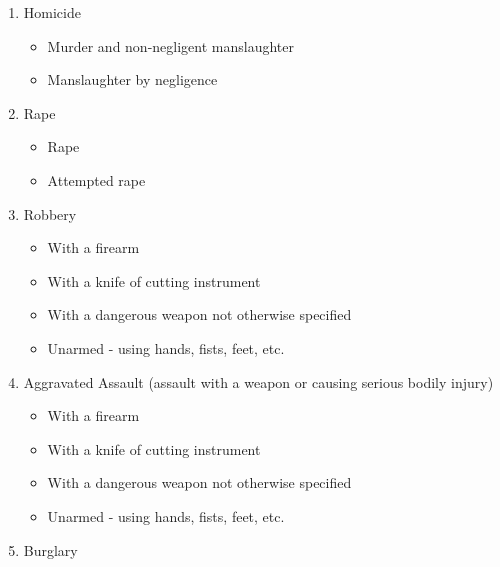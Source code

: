 \documentclass[
  12pt,
]{book}
\providecommand{\tightlist}{%
  \setlength{\itemsep}{0pt}\setlength{\parskip}{0pt}}
\begin{document}
\begin{enumerate}
\def\labelenumi{\arabic{enumi}.}
\tightlist
\item
  Homicide

  \begin{itemize}
  \tightlist
  \item
    Murder and non-negligent manslaughter\\
  \item
    Manslaughter by negligence\\
  \end{itemize}
\item
  Rape

  \begin{itemize}
  \tightlist
  \item
    Rape\\
  \item
    Attempted rape\\
  \end{itemize}
\item
  Robbery

  \begin{itemize}
  \tightlist
  \item
    With a firearm\\
  \item
    With a knife of cutting instrument\\
  \item
    With a dangerous weapon not otherwise specified\\
  \item
    Unarmed - using hands, fists, feet, etc.\\
  \end{itemize}
\item
  Aggravated Assault (assault with a weapon or causing serious bodily injury)

  \begin{itemize}
  \tightlist
  \item
    With a firearm\\
  \item
    With a knife of cutting instrument\\
  \item
    With a dangerous weapon not otherwise specified\\
  \item
    Unarmed - using hands, fists, feet, etc.\\
  \end{itemize}
\item
  Burglary


\end{enumerate}
\end{document}
